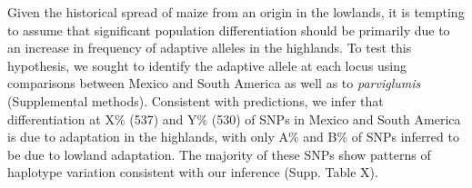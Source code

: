 {{{Given the historical spread of maize from an origin in the lowlands, it is tempting to assume that significant population differentiation should be primarily due to an increase in frequency of adaptive alleles in the highlands.
To test this hypothesis, we sought to identify the adaptive allele at each locus using comparisons between Mexico and South America as well as to \emph{parviglumis} (Supplemental methods).
%
%
%
%
Consistent with predictions, we infer that differentiation at X\% (537) and Y\% (530) of SNPs in Mexico and South America is due to adaptation in the highlands, with only A\% and B\% of SNPs inferred to be due to lowland adaptation. The majority of these SNPs show patterns of haplotype variation consistent with our inference (Supp. Table X).
}}}
